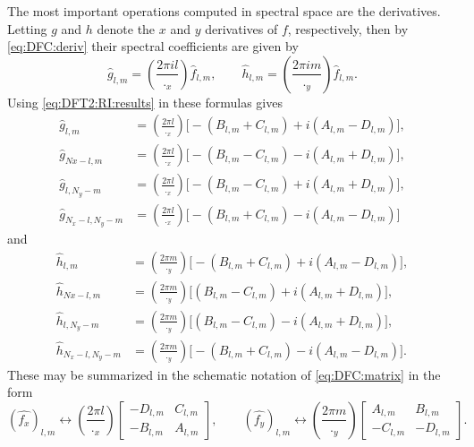 \documentclass[12pt]{article}
\newcommand{\dfc}[1]{\widehat{#1}}  %
\newcommand{\Fc}[1]{\dfc{#1}}       %
\begin{document}
The most important operations computed in spectral space are the derivatives.
Letting $g$ and $h$ denote the $x$ and $y$ derivatives of $f$, respectively,
then by \eqref{eq:DFC:deriv} their spectral coefficients are given by
\begin{equation}
   \dfc{g}_{l,m} = \left(\frac{2\pi i l}{\period_x}\right) \dfc{f}_{l,m} ,
\qquad
   \dfc{h}_{l,m} = \left(\frac{2\pi i m}{\period_y}\right) \dfc{f}_{l,m} .
\label{eq:DFC:deriv:xy}
\end{equation}
Using \eqref{eq:DFT2:RI:results} in these formulas gives
\begin{align}
   \Fc{g}_{l,m} &= \left(\frac{2\pi l}{\period_x}\right)
      \Big[ -(B_{l,m} + C_{l,m}) + i(A_{l,m} - D_{l,m})\Big] ,
\\
   \Fc{g}_{Nx-l,m} &= \left(\frac{2\pi l}{\period_x}\right)
      \Big[ -(B_{l,m} - C_{l,m}) - i(A_{l,m} + D_{l,m})\Big] ,
\\
   \Fc{g}_{l,N_y-m} &= \left(\frac{2\pi l}{\period_x}\right)
      \Big[ -(B_{l,m} - C_{l,m}) + i(A_{l,m} + D_{l,m})\Big] ,
\\
   \Fc{g}_{N_x-l,N_y-m} &= \left(\frac{2\pi l}{\period_x}\right)
      \Big[ -(B_{l,m} + C_{l,m}) - i(A_{l,m} - D_{l,m})\Big] 
\label{eq:DFT2:RI:deriv:x}
\end{align}
and
\begin{align}
   \Fc{h}_{l,m} &= \left(\frac{2\pi m}{\period_y}\right)
      \Big[ -(B_{l,m} + C_{l,m}) + i(A_{l,m} - D_{l,m})\Big] ,
\\
   \Fc{h}_{Nx-l,m} &= \left(\frac{2\pi m}{\period_y}\right)
      \Big[ (B_{l,m} - C_{l,m}) + i(A_{l,m} + D_{l,m})\Big] ,
\\
   \Fc{h}_{l,N_y-m} &= \left(\frac{2\pi m}{\period_y}\right)
      \Big[ (B_{l,m} - C_{l,m}) - i(A_{l,m} + D_{l,m})\Big] ,
\\
   \Fc{h}_{N_x-l,N_y-m} &= \left(\frac{2\pi m}{\period_y}\right)
      \Big[ -(B_{l,m} + C_{l,m}) - i(A_{l,m} - D_{l,m})\Big] .
\label{eq:DFT2:RI:deriv:y}
\end{align}
These may be summarized in the schematic notation of \eqref{eq:DFC:matrix}
in the form
\begin{equation}
   (\Fc{f_{x}})_{l,m} \leftrightarrow\left(\frac{2\pi l}{\period_x}\right)
   \begin{bmatrix} -D_{l,m} & C_{l,m} \\ -B_{l,m} & A_{l,m} \end{bmatrix},
\qquad
   (\Fc{f_{y}})_{l,m} \leftrightarrow\left(\frac{2\pi m}{\period_y}\right)
   \begin{bmatrix} A_{l,m} & B_{l,m} \\ -C_{l,m} & -D_{l,m} \end{bmatrix}.
\label{eq:DFC:matrix:deriv}
\end{equation}
\end{document}
